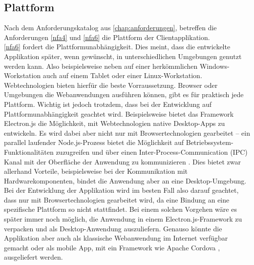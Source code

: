 \subsection{Plattform}
\label{subs:plattform}

Nach dem Anforderungskatalog aus \autoref{chap:anforderungen}, betreffen die Anforderungen
\ref{nfa4} und \ref{nfa6} die Plattform der Clientapplikation.\\

\ref{nfa6} fordert die Plattformunabhängigkeit. Dies meint, dass die entwickelte
Applikation später, wenn gewünscht, in unterschiedlichen Umgebungen genutzt werden kann.
Also beispielsweise neben auf einer herkömmlichen Windows-Workstation auch auf einem
Tablet oder einer Linux-Workstation. Webtechnologien bieten hierfür die beste Vorraussetzung. 
Browser oder Umgebungen die Webanwendungen ausführen können, gibt es für praktisch 
jede Plattform. Wichtig ist jedoch trotzdem, dass bei der Entwicklung auf
Plattformunabhängigkeit geachtet wird. Beispielsweise bietet das Framework Electron.js die 
Möglichkeit, mit Webtechnologien native Desktop-Apps zu entwickeln. Es wird dabei aber nicht
nur mit Browsertechnologien gearbeitet -- ein parallel laufender Node.js-Prozess bietet
die Möglichkeit auf Betriebssystem-Funktionalitäten zuzugreifen 
und über einen Inter-Process-Communication (IPC) Kanal mit der Oberfläche der Anwendung zu
kommunizieren \cite{electron-architecture}. Dies bietet zwar allerhand Vorteile, 
beispielsweise bei der Kommunikation mit Hardwarekomponenten, bindet die Anwendung aber an eine Desktop-Umgebung. 
Bei der Entwicklung der Applikation wird im besten Fall also darauf geachtet, dass nur mit 
Browsertechnologien gearbeitet wird, da eine Bindung an eine spezifische Plattform so 
nicht stattfindet. Bei einem solchen Vorgehen wäre es später immer noch möglich, 
die Anwendung in einem Electron.js-Framework zu verpacken und als Desktop-Anwendung auszuliefern. 
Genauso könnte die Applikation aber auch als klassische Webanwendung im Internet verfügbar gemacht oder 
als mobile App, mit ein Framework wie Apache Cordova \cite{cordova}, ausgeliefert werden.\\

